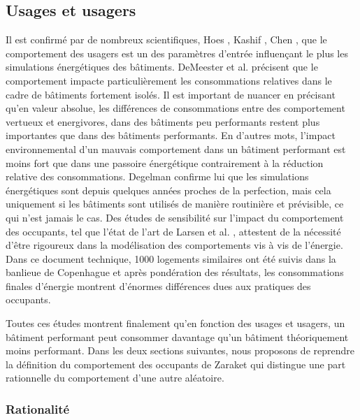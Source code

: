 \subsection{Usages et usagers}

Il est confirmé par de nombreux scientifiques, Hoes \cite{Hoes-09}, Kashif \cite{Kashif-13}, Chen \cite{Chen-12}, que le comportement des usagers est un des paramètres d'entrée influençant le plus les simulations énergétiques des bâtiments. DeMeester et al. \cite{deMeester-13} précisent que le comportement impacte particulièrement les consommations relatives dans le cadre de bâtiments fortement isolés. Il est important de nuancer en précisant qu'en valeur absolue, les différences de consommations entre des comportement vertueux et energivores, dans des bâtiments peu performants restent plus importantes que dans des bâtiments performants. En d'autres mots, l'impact environnemental d'un mauvais comportement dans un bâtiment performant est moins fort que dans une passoire énergétique contrairement à la réduction relative des consommations. Degelman \cite{Degelman-99} confirme lui que les simulations énergétiques sont depuis quelques années proches de la perfection, mais cela uniquement si les bâtiments sont utilisés de manière routinière et prévisible, ce qui n'est jamais le cas. Des études de sensibilité sur l'impact du comportement des occupants, tel que l'état de l'art de Larsen et al. \cite{Larsen-10}, attestent de la nécessité d'être rigoureux dans la modélisation des comportements vis à vis de l'énergie. Dans ce document technique, 1000 logements similaires ont été suivis dans la banlieue de Copenhague et après pondération des résultats, les consommations finales d'énergie montrent d'énormes différences dues aux pratiques des occupants. 

Toutes ces études montrent finalement qu'en fonction des usages et usagers, un bâtiment performant peut consommer davantage qu'un bâtiment théoriquement moins performant. Dans les deux sections suivantes, nous proposons de reprendre la définition du comportement des occupants de Zaraket \cite{Zaraket-14} qui distingue une part rationnelle du comportement d'une autre aléatoire.

\subsubsection{Rationalité}

